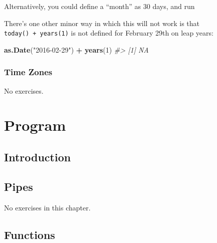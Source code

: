 \documentclass[]{book}
\newenvironment{Shaded}{\begin{snugshade}}{\end{snugshade}}
\newcommand{\CommentTok}[1]{\textcolor[rgb]{0.56,0.35,0.01}{\textit{#1}}}
\newcommand{\DecValTok}[1]{\textcolor[rgb]{0.00,0.00,0.81}{#1}}
\newcommand{\KeywordTok}[1]{\textcolor[rgb]{0.13,0.29,0.53}{\textbf{#1}}}
\newcommand{\NormalTok}[1]{#1}
\newcommand{\OperatorTok}[1]{\textcolor[rgb]{0.81,0.36,0.00}{\textbf{#1}}}
\newcommand{\StringTok}[1]{\textcolor[rgb]{0.31,0.60,0.02}{#1}}
\theoremstyle{plain}
\theoremstyle{remark}
\begin{document}
Alternatively, you could define a ``month'' as 30 days, and run

\begin{Shaded}
\end{Shaded}

There's one other minor way in which this will not work is that \texttt{today()\ +\ years(1)} is not defined for February 29th on leap years:

\begin{Shaded}
\begin{Highlighting}[]
\KeywordTok{as.Date}\NormalTok{(}\StringTok{"2016-02-29"}\NormalTok{) }\OperatorTok{+}\StringTok{ }\KeywordTok{years}\NormalTok{(}\DecValTok{1}\NormalTok{)}
\CommentTok{#> [1] NA}
\end{Highlighting}
\end{Shaded}

\hypertarget{time-zones}{%
\section{Time Zones}\label{time-zones}}

No exercises.

\hypertarget{part-program}{%
\part{Program}\label{part-program}}

\hypertarget{program-intro}{%
\chapter{Introduction}\label{program-intro}}

\hypertarget{pipes}{%
\chapter{Pipes}\label{pipes}}

No exercises in this chapter.

\hypertarget{functions}{%
\chapter{Functions}\label{functions}}
\end{document}
